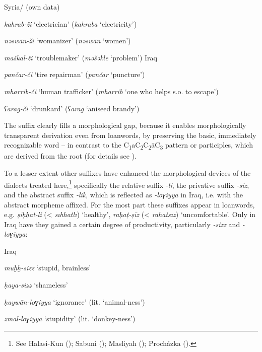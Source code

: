 \documentclass[output=paper]{langsci/langscibook}
\begin{document}
\ea\label{kahrab}
Syria/ (own data)

\textit{kahrab-ži} ‘electrician’ (\textit{kahraba} ‘electricity’)

\textit{nəswān-ži} ‘womanizer’ (\textit{nəswān} ‘women’)

\textit{maškal-ži} ‘troublemaker’ (\textit{məšəkle} ‘problem’)
\ex \label{pancar}
Iraq \citep[40--44]{Procházka-Eisl2018}

\textit{pančar-či} ‘tire repairman’ (\textit{pančar} ‘puncture’)

\textit{mharrib-či} ‘human trafficker’ (\textit{mharrib} ‘one who helps s.o. to escape’)

\textit{ʕarag-či} ‘drunkard’ (\textit{ʕarag} ‘aniseed brandy’)
\z

The suffix clearly fills a morphological gap, because it enables morphologically transparent {derivation} even from {loanwords}, by preserving the basic, immediately recognizable word – in contrast to the  C\textsubscript{1}aC\textsubscript{2}C\textsubscript{2}āC\textsubscript{3}{} pattern or participles, which are derived from the {root} (for details see \citealt{Procházka-Eisl2018}).

To a lesser extent other  suffixes have enhanced the morphological devices of the dialects treated here,\footnote{See Halasi-Kun (\citeyear[68--71]{Halasi-Kun1969}); Sabuni (\citeyear[168]{Sabuni1980}); Masliyah (\citeyear{Masliyah1996}); Procházka (\citeyear[186]{Procházka2002Cukurova}).} specifically the {relative} suffix \textit{-li}, the {privative} suffix \textit{-siz}, and the abstract suffix \textit{-lik}, which is reflected as \textit{-loɣiyya} in Iraq, i.e. with the  abstract morpheme affixed. For the most part these suffixes appear in  {loanwords}, e.g.  \textit{ṣiḥḥat-li} (<  \textit{sıhhatlı}) ‘healthy’, \textit{raḥaṭ-ṣīz} (<  \textit{rahatsız}) ‘uncomfortable’. Only in Iraq have they gained a certain degree of productivity, particularly \textit{-sizz} and \textit{-loɣiyya}:

\ea
Iraq \citep[293--294]{Masliyah1996} 

\textit{muḫḫ-sizz} ‘stupid, brainless’

\textit{ḥaya-sizz} ‘shameless’

\textit{ḥaywān-loɣiyya} ‘ignorance’ (lit. ‘animal-ness’)

\textit{zmāl-loɣiyya} ‘stupidity’ (lit. ‘donkey-ness’)
\z
\end{document}
